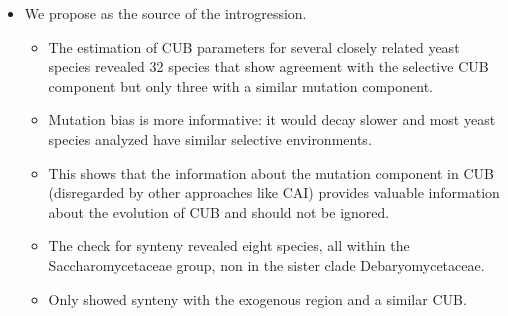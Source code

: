 \documentclass[12pt]{article}
\begin{document}
\begin{itemize}
\begin{itemize}
	\end{itemize}

	\item We propose \gossypii as the source of the introgression.
	\begin{itemize}
		\item The estimation of CUB parameters for several closely related yeast species revealed 32 species that show agreement with the selective CUB component but only three with a similar mutation component.
		\item Mutation bias is more informative: it would decay slower and most yeast species analyzed have similar selective environments.
		\item This shows that the information about the mutation component in CUB (disregarded by other approaches like CAI) provides valuable information about the evolution of CUB and should not be ignored.
		\item The check for synteny revealed eight species, all within the Saccharomycetaceae group, non in the sister clade Debaryomycetaceae.
		\item Only \gossypii showed synteny with the exogenous region and a similar CUB.
	\end{itemize}


\end{itemize}
\end{document}
